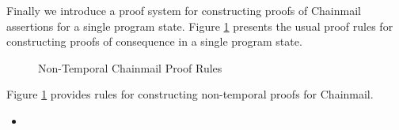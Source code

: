 \documentclass[12pt]{article}
\newcommand\intstep{\hspace{1.5mm}{\raisebox{3pt}{$\bullet$}}\hspace{-1.5mm}{\hookrightarrow}}
\newcommand\oiInternal[3]{#1,\ #2\ \intstep\ #3}
\newcommand\encapsulated[1]{\langle \texttt{encapsulated}\ #1 \rangle}
\newcommand\encapsulates[2]{\langle #1\ \texttt{encapsulates}\ #2 \rangle}
\newcommand\calls[4]{\langle #1\ \texttt{calls}\ #2.#3(#4) \rangle}
\newcommand\changes[2]{\langle #1\ \texttt{changes}\ #2 \rangle}
\newcommand\access[2]{\langle #1\ \texttt{access}\ #2 \rangle}
\newcommand\internal[1]{\langle #1\ \texttt{internal}\rangle}
\numberwithin{case}{lemma}
\numberwithin{case}{theorem}
\numberwithin{subcase}{case}
\begin{document}
{Finally we introduce a proof system for constructing proofs
of Chainmail assertions for a single program state. Figure \ref{f:non-temporal} presents the usual proof rules for constructing 
proofs of consequence in a single program state.

{
\color{Green}
\begin{figure}[h]
\color{Green}
\small
{}
\caption{Non-Temporal Chainmail Proof Rules}
\label{f:non-temporal}
\end{figure}
Figure \ref{f:non-temporal} provides rules for constructing non-temporal proofs 
for Chainmail. 
\begin{itemize}
\item

\end{itemize}}}
\end{document}
